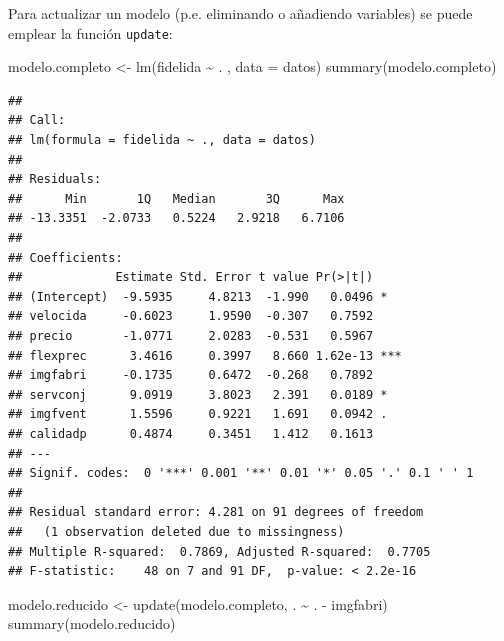 \documentclass[
]{book}
\newenvironment{Shaded}{\begin{snugshade}}{\end{snugshade}}
\newcommand{\AttributeTok}[1]{\textcolor[rgb]{0.77,0.63,0.00}{#1}}
\newcommand{\FunctionTok}[1]{\textcolor[rgb]{0.00,0.00,0.00}{#1}}
\newcommand{\NormalTok}[1]{#1}
\newcommand{\OtherTok}[1]{\textcolor[rgb]{0.56,0.35,0.01}{#1}}
\newcommand{\SpecialCharTok}[1]{\textcolor[rgb]{0.00,0.00,0.00}{#1}}
\theoremstyle{break}
\theoremstyle{nonumberplain}
\begin{document}
Para actualizar un modelo (p.e. eliminando o añadiendo variables) se puede emplear la función \texttt{update}:

\begin{Shaded}
\begin{Highlighting}[]
\NormalTok{modelo.completo }\OtherTok{\textless{}{-}} \FunctionTok{lm}\NormalTok{(fidelida }\SpecialCharTok{\textasciitilde{}}\NormalTok{ . , }\AttributeTok{data =}\NormalTok{ datos)}
\FunctionTok{summary}\NormalTok{(modelo.completo)}
\end{Highlighting}
\end{Shaded}

\begin{verbatim}
## 
## Call:
## lm(formula = fidelida ~ ., data = datos)
## 
## Residuals:
##      Min       1Q   Median       3Q      Max 
## -13.3351  -2.0733   0.5224   2.9218   6.7106 
## 
## Coefficients:
##             Estimate Std. Error t value Pr(>|t|)    
## (Intercept)  -9.5935     4.8213  -1.990   0.0496 *  
## velocida     -0.6023     1.9590  -0.307   0.7592    
## precio       -1.0771     2.0283  -0.531   0.5967    
## flexprec      3.4616     0.3997   8.660 1.62e-13 ***
## imgfabri     -0.1735     0.6472  -0.268   0.7892    
## servconj      9.0919     3.8023   2.391   0.0189 *  
## imgfvent      1.5596     0.9221   1.691   0.0942 .  
## calidadp      0.4874     0.3451   1.412   0.1613    
## ---
## Signif. codes:  0 '***' 0.001 '**' 0.01 '*' 0.05 '.' 0.1 ' ' 1
## 
## Residual standard error: 4.281 on 91 degrees of freedom
##   (1 observation deleted due to missingness)
## Multiple R-squared:  0.7869, Adjusted R-squared:  0.7705 
## F-statistic:    48 on 7 and 91 DF,  p-value: < 2.2e-16
\end{verbatim}

\begin{Shaded}
\begin{Highlighting}[]
\NormalTok{modelo.reducido }\OtherTok{\textless{}{-}} \FunctionTok{update}\NormalTok{(modelo.completo, . }\SpecialCharTok{\textasciitilde{}}\NormalTok{ . }\SpecialCharTok{{-}}\NormalTok{ imgfabri)}
\FunctionTok{summary}\NormalTok{(modelo.reducido)}
\end{Highlighting}
\end{Shaded}
\end{document}
